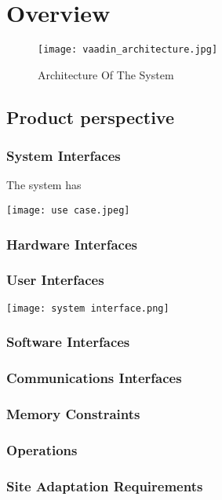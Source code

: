 \documentclass{article}
\begin{document}
\section{Overview}

\begin{figure}
    
    \texttt{[image: vaadin\_architecture.jpg]}
       \caption{Architecture Of The System }
       \centering
        \label{}
\end{figure}
    


\subsection{Product perspective}
\subsubsection{System Interfaces}
The system has 
    
    \texttt{[image: use case.jpeg]}
    
\subsubsection{Hardware Interfaces}
\subsubsection{User Interfaces}
 \texttt{[image: system interface.png]}
 
 \subsubsection{Software Interfaces}

\subsubsection{Communications Interfaces}
\subsubsection{Memory Constraints}
\subsubsection{Operations}
\subsubsection{Site Adaptation Requirements}
\end{document}
